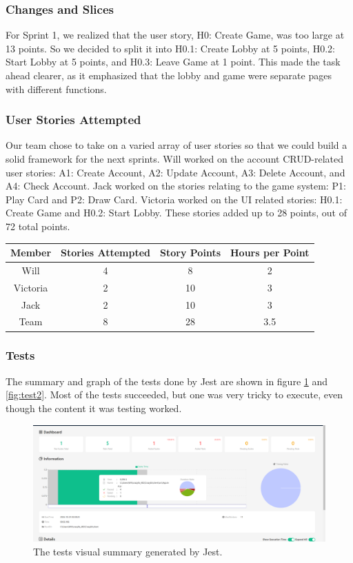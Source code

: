 \documentclass{article}
\begin{document}
\subsubsection{Changes and Slices}
For Sprint 1, we realized that the user story, H0: Create Game, was too large at 13 points. So we decided to split it into H0.1: Create Lobby at 5 points, H0.2: Start Lobby at 5 points, and H0.3: Leave Game at 1 point. This made the task ahead clearer, as it emphasized that the lobby and game were separate pages with different functions.

\subsubsection{User Stories Attempted}
Our team chose to take on a varied array of user stories so that we could build a solid framework for the next sprints. Will worked on the account CRUD-related user stories: A1: Create Account, A2: Update Account, A3: Delete Account, and A4: Check Account. Jack worked on the stories relating to the game system: P1: Play Card and P2: Draw Card. Victoria worked on the UI related stories: H0.1: Create Game and H0.2: Start Lobby. These stories added up to 28 points, out of 72 total points.

\begin{table}[h]
\centering
\begin{tabular}{|c|c|c|c|}
\hline
\textbf{Member} & \textbf{Stories Attempted} & \textbf{Story Points} & \textbf{Hours per Point} \\ \hline
Will     & 4 & 8  & 2 \\ \hline
Victoria & 2 & 10 & 3 \\ \hline
Jack     & 2 & 10 & 3 \\ \hline
Team    & 8 & 28 & 3.5 \\ \hline
\end{tabular}
\end{table}

\subsubsection{Tests}
The summary and graph of the tests done by Jest are shown in figure \ref{fig:test1} and \ref{fig:test2}. Most of the tests succeeded, but one was very tricky to execute, even though the content it was testing worked.

\begin{figure}[h]
\centering
\includegraphics[width=\linewidth]{tests1.png}
\caption{\label{fig:test1}The tests visual summary generated by Jest.}
\end{figure}
\end{document}
